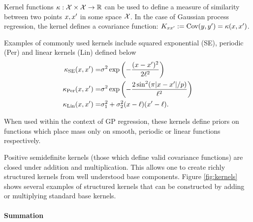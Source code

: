 \documentclass[twoside]{article}
\begin{document}
Kernel functions $\kappa : \mathcal{X} \times \mathcal{X} \to \mathbb{R}$ can be used to define a measure of similarity between two points $x, x'$ in some space $\mathcal{X}$.
In the case of Gaussian process regression, the kernel defines a covariance function: ${K_{x x'} := \textrm{Cov}(y, y') = \kappa(x,x')}$. 

Examples of commonly used kernels include squared exponential (SE), periodic (Per) and linear kernels (Lin) defined below
\begin{eqnarray}
\kappa_\textrm{SE}(x, x') = & \sigma^2\exp\left(-\frac{(x - x')^2}{2\ell^2}\right) \\
\kappa_\textrm{Per}(x, x') = & \sigma^2\exp\left(-\frac{2\sin^2(\pi|x - x'|/p)}{\ell^2}\right) \\
\kappa_\textrm{Lin}(x, x') = & \sigma_1^2 + \sigma_2^2(x - \ell)(x' - \ell).
\end{eqnarray}

When used within the context of GP regression, these kernels define priors on functions which place mass only on smooth, periodic or linear functions respectively.

Positive semidefinite kernels (\ie those which define valid covariance functions) are closed under addition and multiplication.
This allows one to create richly structured kernels from well understood base components.  Figure \ref{fig:kernels} shows several examples of structured kernels that can be constructed by adding or multiplying standard base kernels.

%


\paragraph{Summation}
\end{document}
